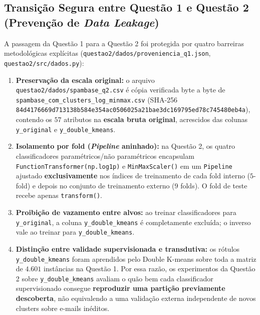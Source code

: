 \documentclass[a4paper,11pt]{article}
\begin{document}
\subsection{\texorpdfstring{Transição Segura entre Questão 1 e Questão 2 (Prevenção de \textit{Data Leakage})}{Transição Segura entre Questão 1 e Questão 2 (Prevenção de Data Leakage)}}\label{sec:2-2-transicao-segura-entre-questao-1-e-questao-2-prevencao-de-data-leakage}


A passagem da Questão 1 para a Questão 2 foi protegida por quatro barreiras metodológicas explícitas (\texttt{questao2/\allowbreak dados/\allowbreak proveniencia\_\allowbreak q1.json}, \texttt{questao2/\allowbreak src/\allowbreak dados.py}):

\begin{enumerate}[leftmargin=1.5em, itemsep=0.25em, topsep=0.25em]
  \item \textbf{Preservação da escala original:} o arquivo \texttt{questao2/\allowbreak dados/\allowbreak spambase\_\allowbreak q2.csv} é cópia verificada byte a byte de \texttt{spambase\_\allowbreak com\_\allowbreak clusters\_\allowbreak log\_\allowbreak minmax.csv} (SHA-256 \texttt{84d4176669d71313\allowbreak 8b584e354ac05060\allowbreak 25a21bae3dc16979\allowbreak 5ed78c745480eb4a}), contendo os $57$ atributos na \textbf{escala bruta original}, acrescidos das colunas \texttt{y\_\allowbreak original} e \texttt{y\_\allowbreak double\_\allowbreak kmeans}.
  \item \textbf{Isolamento por fold (\textit{Pipeline} aninhado):} na Questão 2, os quatro classificadores paramétricos/não paramétricos encapsulam \texttt{FunctionTransformer(\allowbreak np.log1p)} e \texttt{MinMaxScaler(\allowbreak )} em um \texttt{Pipeline} ajustado \textbf{exclusivamente} nos índices de treinamento de cada fold interno ($5$-fold) e depois no conjunto de treinamento externo ($9$ folds). O fold de teste recebe apenas \texttt{transform(\allowbreak )}.
  \item \textbf{Proibição de vazamento entre alvos:} ao treinar classificadores para \texttt{y\_\allowbreak original}, a coluna \texttt{y\_\allowbreak double\_\allowbreak kmeans} é completamente excluída; o inverso vale ao treinar para \texttt{y\_\allowbreak double\_\allowbreak kmeans}.
  \item \textbf{Distinção entre validade supervisionada e transdutiva:} os rótulos \texttt{y\_\allowbreak double\_\allowbreak kmeans} foram aprendidos pelo Double K-means sobre toda a matriz de $4.601$ instâncias na Questão 1. Por essa razão, os experimentos da Questão 2 sobre \texttt{y\_\allowbreak double\_\allowbreak kmeans} avaliam o quão bem cada classificador supervisionado consegue \textbf{reproduzir uma partição previamente descoberta}, não equivalendo a uma validação externa independente de novos clusters sobre e-mails inéditos.
\end{enumerate}
\end{document}
